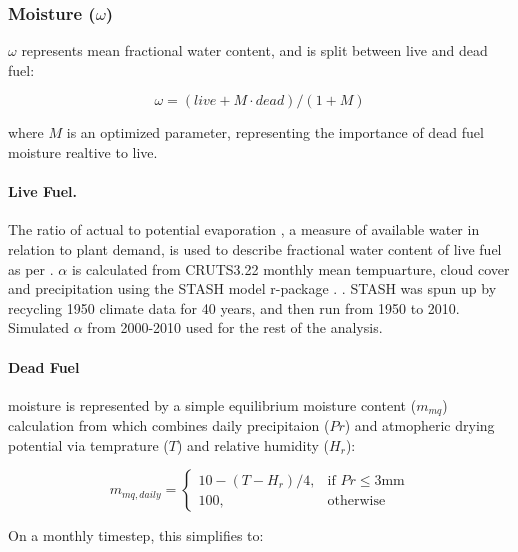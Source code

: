 \subsubsection{Moisture ($\omega$)}

$\omega$ represents mean fractional water content, and is split between live and dead fuel:

\begin{equation}
    \omega = (live + M \cdot dead) / (1 + M)
\end{equation}

where $M$ is an optimized parameter, representing the importance of dead fuel moisture realtive to live.

\paragraph{Live Fuel.}
The ratio of actual to potential evaporation \citep[$\alpha$][]{prentice1993simulation}, a measure of available water in relation to plant demand, is used to describe fractional water content of live fuel as per \citet{harrison2010fire, bistinas2014causal}.
$\alpha$ is calculated from CRUTS3.22 monthly mean tempuarture, cloud cover and precipitation using the STASH model \citep{sykes1996bioclimatic} r-package \citep{rstash}. . STASH was spun up by recycling 1950 climate data for 40 years, and then run from 1950 to 2010. Simulated $\alpha$ from 2000-2010 used for the rest of the analysis.

\paragraph{Dead Fuel} moisture is represented by a simple equilibrium moisture content ($m_{mq}$) calculation from \citep{viney1991review} which combines daily precipitaion ($Pr$) and atmopheric drying potential via temprature ($T$) and relative humidity ($H_r$):

\begin{equation}
     m_{mq, daily}=
        \begin{cases}
            10 - (T - H_r) / 4 ,& \text{if } Pr\leq 3 \text{mm}\\
            100,              & \text{otherwise}
        \end{cases}
\end{equation}

On a monthly timestep, this simplifies to:

